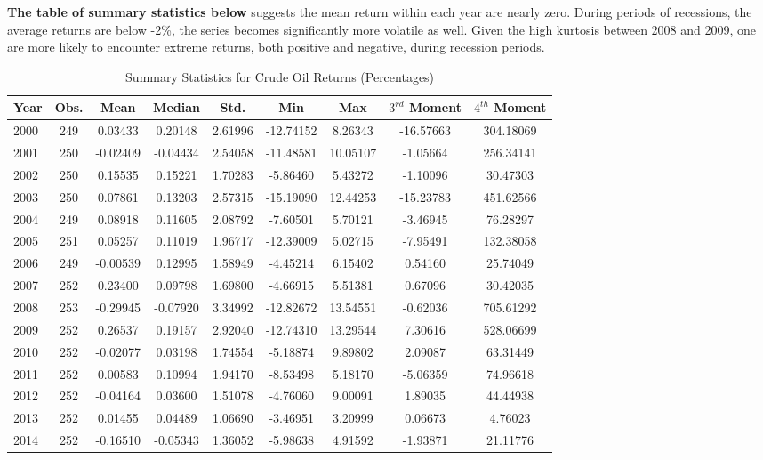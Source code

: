 \documentclass[12pt]{article}
\begin{document}
	\par \textbf{The table of summary statistics below} suggests the mean return within each year are nearly zero. During periods of recessions, the average returns are below -2\%, the series becomes significantly more volatile as well. Given the high kurtosis between 2008 and 2009, one are more likely to encounter extreme returns, both positive and negative, during recession periods.
	\begin{table}[H]
		\small
		\centering
		\caption{Summary Statistics for Crude Oil Returns (Percentages)}
		\begin{tabular}{l|c c c c c c c c}
			\toprule
Year & Obs. & Mean & Median & Std. & Min & Max & $3^{rd}$ Moment & $4^{th}$ Moment \\
			\midrule
2000 & 249 & 0.03433 & 0.20148 & 2.61996 & -12.74152 & 8.26343 & -16.57663 & 304.18069 \\
2001 & 250 & -0.02409 & -0.04434 & 2.54058 & -11.48581 & 10.05107 & -1.05664 & 256.34141 \\
2002 & 250 & 0.15535 & 0.15221 & 1.70283 & -5.86460 & 5.43272 & -1.10096 & 30.47303 \\
2003 & 250 & 0.07861 & 0.13203 & 2.57315 & -15.19090 & 12.44253 & -15.23783 & 451.62566 \\
2004 & 249 & 0.08918 & 0.11605 & 2.08792 & -7.60501 & 5.70121 & -3.46945 & 76.28297 \\
2005 & 251 & 0.05257 & 0.11019 & 1.96717 & -12.39009 & 5.02715 & -7.95491 & 132.38058 \\
2006 & 249 & -0.00539 & 0.12995 & 1.58949 & -4.45214 & 6.15402 & 0.54160 & 25.74049 \\
2007 & 252 & 0.23400 & 0.09798 & 1.69800 & -4.66915 & 5.51381 & 0.67096 & 30.42035 \\
2008 & 253 & -0.29945 & -0.07920 & 3.34992 & -12.82672 & 13.54551 & -0.62036 & 705.61292 \\
2009 & 252 & 0.26537 & 0.19157 & 2.92040 & -12.74310 & 13.29544 & 7.30616 & 528.06699 \\
2010 & 252 & -0.02077 & 0.03198 & 1.74554 & -5.18874 & 9.89802 & 2.09087 & 63.31449 \\
2011 & 252 & 0.00583 & 0.10994 & 1.94170 & -8.53498 & 5.18170 & -5.06359 & 74.96618 \\
2012 & 252 & -0.04164 & 0.03600 & 1.51078 & -4.76060 & 9.00091 & 1.89035 & 44.44938 \\
2013 & 252 & 0.01455 & 0.04489 & 1.06690 & -3.46951 & 3.20999 & 0.06673 & 4.76023 \\
2014 & 252 & -0.16510 & -0.05343 & 1.36052 & -5.98638 & 4.91592 & -1.93871 & 21.11776 \\

\end{tabular}
\end{table}
\end{document}
